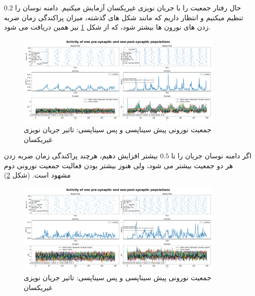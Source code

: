         حال رفتار جمعیت را با جریان نویزی غیریکسان آزمایش میکنیم. دامنه نوسان را 
        $0.2$ 
        تنظیم میکنیم و انتظار داریم که مانند شکل های گذشته، میزان پراکندگی زمان ضربه زدن های نورون ها بیشتر شود، که از شکل 
        \ref{fig:part1-two-ng-with-synapse-diff-curr}
        نیز همین دریافت می شود.
        \begin{figure}[!ht]
            \centering
            \includegraphics[width=0.9\textwidth]{plots/part1-two-ng-with-synapse-diff-curr.pdf} 
            \caption{جمعیت نورونی پیش سیناپسی و پس سیناپسی: تاثیر جریان نویزی غیریکسان}
            \label{fig:part1-two-ng-with-synapse-diff-curr}
        \end{figure}

        اگر دامنه نوسان جریان را تا 
        $0.5$ 
        بیشتر افزایش دهیم، هرچند پراکندگی زمان ضربه زدن هر دو جمعیت بیشتر می شود، ولی هنوز بیشتر بودن فعالیت جمعیت نورونی دوم مشهود است.
        (شکل \ref{fig:part1-two-ng-with-synapse-high-diff-curr})
        \begin{figure}[!ht]
            \centering
            \includegraphics[width=0.9\textwidth]{plots/part1-two-ng-with-synapse-high-diff-curr.pdf} 
            \caption{جمعیت نورونی پیش سیناپسی و پس سیناپسی: تاثیر جریان نویزی غیریکسان}
            \label{fig:part1-two-ng-with-synapse-high-diff-curr}
        \end{figure}
 
